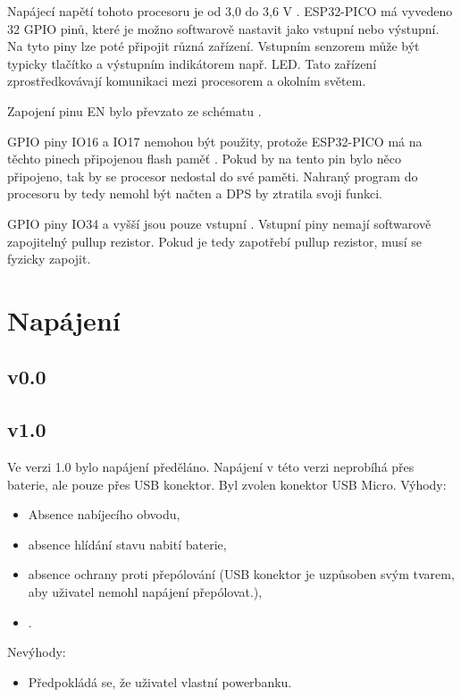   Napájecí napětí tohoto procesoru je od 3,0 do 3,6 V \cite{PICO_datasheet}. ESP32-PICO má vyvedeno 32 GPIO pinů, které je 
  možno softwarově nastavit jako vstupní nebo výstupní. Na tyto piny lze poté připojit různá zařízení. Vstupním senzorem může 
  být typicky tlačítko a výstupním indikátorem např. LED. Tato zařízení zprostředkovávají komunikaci mezi procesorem a okolním 
  světem.

  Zapojení pinu EN bylo převzato ze schématu \cite{PICO_datasheet}.

  GPIO piny IO16 a IO17 nemohou být použity, protože ESP32-PICO má na těchto pinech připojenou flash paměť \cite{PICO_datasheet}.
  Pokud by na tento pin bylo něco připojeno, tak by se procesor nedostal do své paměti. Nahraný program do procesoru by tedy
  nemohl být načten a DPS by ztratila svoji funkci.

  GPIO piny IO34 a vyšší jsou pouze vstupní \cite{PICO_datasheet}. Vstupní piny nemají softwarově zapojitelný pullup rezistor. 
  Pokud je tedy zapotřebí pullup rezistor, musí se fyzicky zapojit.
  
  \section{Napájení}
  \subsection{v0.0}
  \subsection{v1.0}
  Ve verzi 1.0 bylo napájení předěláno. Napájení v této verzi neprobíhá přes baterie, ale pouze přes USB konektor. Byl 
  zvolen konektor USB Micro.
  Výhody:
  \begin{itemize}
    \item Absence nabíjecího obvodu,
    \item absence hlídání stavu nabití baterie,
    \item absence ochrany proti přepólování (USB konektor je uzpůsoben svým tvarem, aby uživatel nemohl napájení přepólovat.),
    \item .
  \end{itemize}

  Nevýhody:
  \begin{itemize}
    \item Předpokládá se, že uživatel vlastní powerbanku.%
  \end{itemize}

